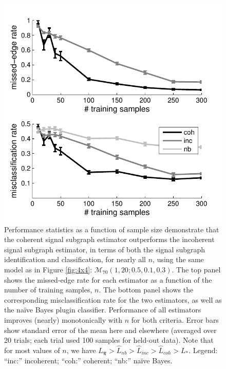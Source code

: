 \documentclass[10pt,journal,cspaper,compsoc]{IEEEtran}
\providecommand{\mc}[1]{\mathcal{#1}}
\providecommand{\mh}[1]{\hat{#1}}
\providecommand{\mhb}[1]{\hat{\boldsymbol{#1}}}
\begin{document}
\begin{figure}[htbp]
	\centering
		\includegraphics[width=1.0\linewidth]{../figs/homo_V70_s20_p10_q30_Lhats.pdf}
	\caption{Performance statistics as a function of sample size demonstrate that the coherent signal subgraph estimator outperforms the incoherent signal subgraph estimator, in terms of both the signal subgraph identification and classification, for nearly all $n$, using the same model as in Figure \ref{fig:4x4}: $\mc{M}_{70}(1,20;0.5,0.1,0.3)$.  The top panel shows the missed-edge rate for each estimator as a function of the number of training samples, $n$.  The bottom panel shows the corresponding misclassification rate for the two estimators, as well as the na\"ive Bayes plugin classifier.  Performance of all estimators improves (nearly) monotonically with $n$ for both criteria.  Error bars show standard error of the mean here and elsewhere (averaged over 20 trials; each trial used 100 samples for held-out data). Note that for most values of $n$, we have $L_{\mhb{\pi}} > \mh{L}_{nb} > \mh{L}_{inc} > \mh{L}_{coh} > L_*$. Legend: ``inc:'' incoherent; ``coh:'' coherent; ``nb:'' na\"ive Bayes.}
	\label{fig:homo}
\end{figure}
\end{document}
